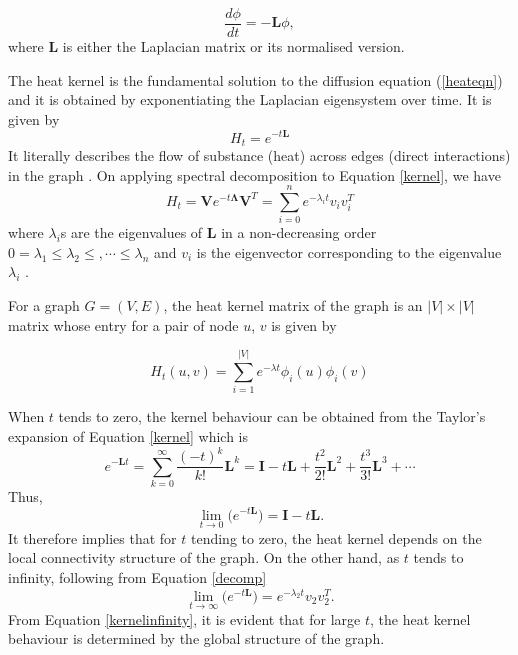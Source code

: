 \documentclass[10pt,a4paper]{article}
\begin{document}
        \begin{equation}
        \frac{d \phi}{dt} = -\mathbf{L} \phi,
        \label{heateqn}
        \end{equation}
        where $\mathbf{L}$ is either the Laplacian matrix or its normalised version. 
        
        The heat kernel is the fundamental solution to the diffusion equation (\ref{heateqn}) and it is obtained by exponentiating the Laplacian eigensystem over time. It is given by
        \begin{equation}
        H_t = e^{-t \mathbf{L}} 
        \label{kernel}
        \end{equation}
        It literally describes the flow of substance (heat) across edges (direct interactions) in the graph \citep{xiao2009graph}.
        On applying spectral decomposition to Equation \ref{kernel}, we have 
        \begin{equation}
        H_t = \mathbf{V} e^{-t \mathbf{\Lambda}} \mathbf{V}^T =  \sum_{i=0}^n e^{-\lambda_i t} v_i v_i^T 
        \label{decomp}
        \end{equation}
        where $\lambda_i$s are the eigenvalues of $\mathbf{L}$ in a non-decreasing order $0=\lambda_1 \leq  \lambda_2 \leq, \cdots \leq \lambda_n$ and $v_i$ is the eigenvector corresponding to the eigenvalue $\lambda_i$ \citep{anton2007elementary}.
        
        For a graph $G=(V,E)$, the heat kernel matrix of the graph is an $|V| \times |V|$ matrix whose entry for a pair of node $u$, $v$ is given by 
        
        \begin{equation}
        H_t(u,v) = \sum_{i=1}^{|V|} e^{-\lambda t} \phi_i(u) \phi_i(v)
        \end{equation} 
       
        When $t$ tends to zero, the kernel behaviour can be obtained from the Taylor's expansion of  Equation \ref{kernel} which is 
        \begin{equation}
        e^{-\mathbf{L}t} = \sum_{k=0}^{\infty} \frac{(-t)^k}{k!} \mathbf{L}^k = \mathbf{I} -t \mathbf{L} + \frac{ t^2}{2!}\mathbf{L}^2 + \frac{ t^3 }{3!}\mathbf{L}^3 + \cdots
        \end{equation}
        Thus,
        \begin{equation}
        \lim_{t\longrightarrow 0} \Big(e^{-t\mathbf{L}}\Big) = \mathbf{I} - t\mathbf{L}.
        \label{kerneltozero}
        \end{equation}
        It therefore implies that for $t$ tending to zero, the heat kernel depends on the local connectivity structure of the graph.
        On the other hand, as $t$ tends to infinity, following from Equation \ref{decomp}
        \begin{equation}
        \lim_{t\longrightarrow \infty} \Big(e^{-t\mathbf{L}}\Big) = e^{-\lambda_2 t} v_2 v _2^T.
        \label{kernelinfinity}  
        \end{equation}
        From Equation \ref{kernelinfinity}, it is evident that for large $t$, the heat kernel behaviour is determined by the global structure of the graph. 
        
\end{document}

